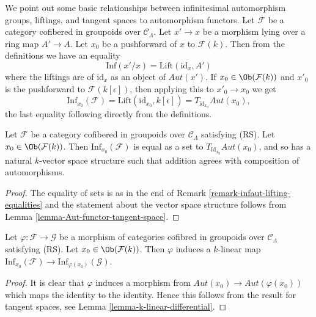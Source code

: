 \begin{remark}
\label{remark-infaut-lifting-equalities}
We point out some basic relationships between infinitesimal automorphism
groups, liftings, and tangent spaces to automorphism functors. Let
$\mathcal{F}$ be a category cofibered in groupoids over $\mathcal{C}_\Lambda$.
Let $x' \to x$ be a morphism lying over a ring map $A' \to A$.  Let
$x_0$ be a pushforward of $x$ to $\mathcal{F}(k)$.
Then from the definitions we have an equality
$$
\text{Inf}(x'/x) = \text{Lift}(\text{id}_x, A')
$$
where the liftings are of $\text{id}_x$ as an object of
$\mathit{Aut}(x')$.  If $x_0 \in \Ob(\mathcal{F}(k))$ and $x'_0$
is the pushforward to $\mathcal{F}(k[\epsilon])$, then applying this to
$x'_0 \to x_0$ we get
$$
\text{Inf}_{x_0}(\mathcal{F}) =
\text{Lift}(\text{id}_{x_0}, k[\epsilon]) =
T_{\text{id}_{x_0}} \mathit{Aut}(x_0),
$$
the last equality following directly from the definitions.
\end{remark}

\begin{lemma}
\label{lemma-infaut-vector-space}
Let $\mathcal{F}$ be a category cofibered in groupoids over
$\mathcal{C}_\Lambda$ satisfying (RS). Let $x_0 \in \Ob(\mathcal{F}(k))$.
Then $\text{Inf}_{x_0}(\mathcal{F})$ is equal as a set to
$T_{\text{id}_{x_0}} \mathit{Aut}(x_0)$, and so has a natural $k$-vector
space structure such that addition agrees with composition of automorphisms.
\end{lemma}

\begin{proof}
The equality of sets is as in the end of
Remark \ref{remark-infaut-lifting-equalities}
and the statement about the vector space structure follows from
Lemma \ref{lemma-Aut-functor-tangent-space}.
\end{proof}

\begin{lemma}
\label{lemma-k-linear-infaut}
Let $\varphi: \mathcal{F} \to \mathcal{G}$ be a morphism of categories
cofibred in groupoids over $\mathcal{C}_\Lambda$ satisfying (RS).
Let $x_0 \in \Ob(\mathcal{F}(k))$. Then $\varphi$ induces a $k$-linear
map $\text{Inf}_{x_0}(\mathcal{F}) \to \text{Inf}_{\varphi(x_0)}(\mathcal{G})$.
\end{lemma}

\begin{proof}
It is clear that $\varphi$ induces a morphism from
$\mathit{Aut}(x_0) \to \mathit{Aut}(\varphi(x_0))$
which maps the identity to the identity. Hence this follows from
the result for tangent spaces, see
Lemma \ref{lemma-k-linear-differential}.
\end{proof}

